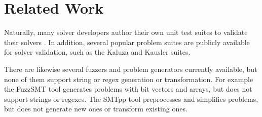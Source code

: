 \section{Related Work}

    Naturally, many solver developers author their own unit test suites to validate their solvers \cite{cvc4-tests} \cite{z3str3-tests} \cite{z3str2-tests}. In addition, several popular problem suites are publicly available for solver validation, such as the Kaluza \cite{kaluza} and Kausler \cite{kausler} suites.

    There are likewise several fuzzers and problem generators currently available, but none of them support string or regex generation or transformation. For example the FuzzSMT\cite{fuzzsmt} tool generates \smt{} problems with bit vectors and arrays, but does not support strings or regexes. The SMTpp\cite{smtpp} tool preprocesses and simplifies problems, but does not generate new ones or transform existing ones.

